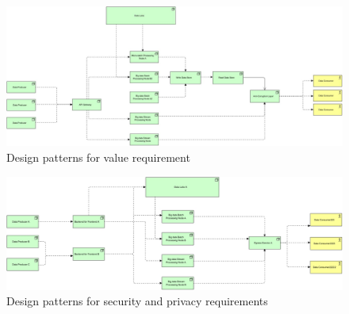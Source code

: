 \documentclass{bmcart}
\begin{document}
\begin{backmatter}
\begin{figure}[h]
    \includegraphics[width=12cm]{Media/Value Requirement.jpg}
    \caption[]{Design patterns for value requirement }
    \label{fig:Value Requirements}
\end{figure}

\begin{figure}[h]
  \includegraphics[width=12cm]{Media/Privacy and Security Requirements.jpg}
  \caption[]{Design patterns for security and privacy requirements}
  \label{fig:SaP Requirements}
\end{figure}

\end{backmatter}
\end{document}
